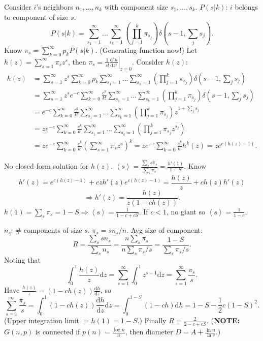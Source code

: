 \documentclass[a4paper,twocolumn,10pt]{article}
\newcommand{\ang}[1]{\left\langle {#1} \right\rangle}
\newcommand{\pte}[1]{\left({#1}\right)}
\newcommand{\dd}{\mathrm{d}}
\begin{document}
		Consider $i$'s neighbors $n_1,...,n_k$ with component size $s_1,...,s_k$.
		$P(s|k)$: $i$ belongs to component of size $s$.
		\[
			P(s|k)=\sum_{s_1=1}^\infty ... \sum_{s_k=1}^\infty
			\pte{\prod_{j=1}^k \pi_{s_j}} \delta(s-1,\sum_j s_j).
		\]
		Know $\pi_s = \sum_{k=0}^\infty p_k P(s|k)$.
		(Generating function now!)
		Let $h(z)=\sum_{s=1}^\infty \pi_s z^s$,
			then $\pi_s=\left. \frac{1}{s!} \frac{\dd^s h}{\dd z^s} \right|_{z=0}$.
		Consider $h(z)$:
		\[ \begin{split}
			h(z) &= \sum_{s=1}^\infty z^s \sum_{k=0}^\infty p_k
			\sum_{s_1=1}^\infty ... \sum_{s_k=1}^\infty
			\pte{\prod_{j=1}^k \pi_{s_j}} \delta(s-1,\sum_j s_j) \\
			&= \sum_{s=1}^\infty z^s e^{-c} \sum_{k=0}^\infty \frac{c^k}{k!}
			\sum_{s_1=1}^\infty ... \sum_{s_k=1}^\infty
			\pte{\prod_{j=1}^k \pi_{s_j}} \delta(s-1,\sum_j s_j) \\
			&= e^{-c} \sum_{k=0}^\infty \frac{c^k}{k!}
			\sum_{s_1=1}^\infty ... \sum_{s_k=1}^\infty
			\pte{\prod_{j=1}^k \pi_{s_j}} z^{1+\sum_j s_j} \\
			&= z e^{-c} \sum_{k=0}^\infty \frac{c^k}{k!}
			\sum_{s_1=1}^\infty ... \sum_{s_k=1}^\infty
			\pte{\prod_{j=1}^k \pi_{s_j} z^{s_j}} \\
			&= z e^{-c} \sum_{k=0}^\infty \frac{c^k}{k!}
			\pte{\sum_{s=1}^\infty \pi_{s} z^{s}}^k 
			= z e^{-c} \sum_{k=0}^\infty \frac{c^k}{k!} h^k(z) 
			= z e^{c(h(z)-1)}.
		\end{split} \]

		No closed-form solution for $h(z)$.
		$\ang{s}=\frac{\sum_s s\pi_s}{\sum_s \pi_s}=\frac{h'(1)}{1-S}$.
		Know
		\[
			h'(z)=e^{c(h(z)-1)} + czh'(z)e^{c(h(z)-1)} = \frac{h(z)}{z} + ch(z)h'(z)
		\]
		\[
			\Longrightarrow h'(z)=\frac{h(z)}{z(1-ch(z))}.
		\]
		$h(1)=\sum_s \pi_s=1-S \Longrightarrow \ang{s}=\frac{1}{1-c+cS}$.
		If $c<1$, no giant so $\ang{s}=\frac{1}{1-c}$.
	
		$n_s$: $\#$ components of size $s$. $\pi_s = s n_s/n$.
		Avg size of component: $$R=\frac{\sum_s s n_s}{\sum_s n_s}
			= \frac{n \sum_s \pi_s}{n \sum_s \pi_s / s}
			= \frac{1-S}{\sum_s \pi_s/s}.$$
		Noting that
		\[
			\int_0^1 \frac{h(z)}{z} \dd z = \sum_{s=1}^\infty \int_0^1 z^{s-1} \dd z
			= \sum_{s=1}^\infty \frac{\pi_s}{s}.
		\]
		Have $\frac{h(z)}{z} = (1-ch(z)) \frac{\dd h}{\dd z}$,
			so $$\sum_{s=1}^\infty \frac{\pi_s}{s}
			=\int_0^1 (1-ch(z)) \frac{\dd h}{\dd z} \dd z
			=\int_0^{1-S}(1-ch) \dd h = 1-S-\frac 1 2 c(1-S)^2.$$
		(Upper integration limit $ = h(1)= 1-S$.)
		Finally $R=\frac{2}{2-c+cS}$.
		(\textbf{NOTE:}
		$G(n,p)$ is connected if $p(n)=\frac{\log n}{n}$,
			then diameter $D=A+\frac{\ln n}{\ln c}$.)
\end{document}
